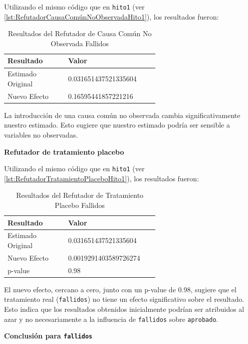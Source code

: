 Utilizando el mismo código que en \texttt{hito1} (ver \ref{lst:RefutadorCausaComúnNoObservadaHito1}), los resultados fueron:

\begin{table}[H]
    \centering
    \begin{tabular}{lp{0.6\linewidth}}
        \toprule
        \textbf{Resultado} & \textbf{Valor} \\
        \midrule
        Estimado Original & 0.031651437521335604 \\
        Nuevo Efecto & 0.16595441857221216 \\
        \bottomrule
    \end{tabular}
    \caption{Resultados del Refutador de Causa Común No Observada Fallidos}
    \label{tab:refutador_causa_no_observada_fallidos}
\end{table}

La introducción de una causa común no observada cambia significativamente nuestro estimado. Esto sugiere que nuestro estimado podría ser sensible a variables no observadas.

\textbf{Refutador de tratamiento placebo}

Utilizando el mismo código que en \texttt{hito1} (ver \ref{lst:RefutadorTratamientoPlaceboHito1}), los resultados fueron:

\begin{table}[H]
    \centering
    \begin{tabular}{lp{0.6\linewidth}}
        \toprule
        \textbf{Resultado} & \textbf{Valor} \\
        \midrule
        Estimado Original & 0.031651437521335604 \\
        Nuevo Efecto & 0.0019291403589726274 \\
        p-value & 0.98 \\
        \bottomrule
    \end{tabular}
    \caption{Resultados del Refutador de Tratamiento Placebo Fallidos}
    \label{tab:refutador_placebo_Fallidos}
\end{table}

El nuevo efecto, cercano a cero, junto con un p-value de 0.98, sugiere que el tratamiento real (\texttt{fallidos}) no tiene un efecto significativo sobre el resultado. Esto indica que los resultados obtenidos inicialmente podrían ser atribuidos al azar y no necesariamente a la influencia de \texttt{fallidos} sobre \texttt{aprobado}.

\textbf{Conclusión para \texttt{fallidos}}

